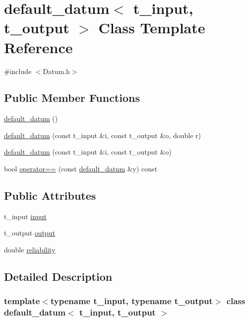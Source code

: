 \hypertarget{classdefault__datum}{}\section{default\+\_\+datum$<$ t\+\_\+input, t\+\_\+output $>$ Class Template Reference}
\label{classdefault__datum}


{\ttfamily \#include $<$Datum.\+h$>$}

\subsection*{Public Member Functions}
\begin{DoxyCompactItemize}
\item 
\hyperlink{classdefault__datum_a7153b5621e08e438753c4a90271c2eee}{default\+\_\+datum} ()
\item 
\hyperlink{classdefault__datum_aaaa9c76cb8d02eab61cc6f0c3570a64d}{default\+\_\+datum} (const t\+\_\+input \&i, const t\+\_\+output \&o, double r)
\item 
\hyperlink{classdefault__datum_aab82d7d96c8fdcecc36b554b83a5e5e2}{default\+\_\+datum} (const t\+\_\+input \&i, const t\+\_\+output \&o)
\item 
bool \hyperlink{classdefault__datum_a1da1cd62c4b98771b010d5b625c2f744}{operator==} (const \hyperlink{classdefault__datum}{default\+\_\+datum} \&y) const
\end{DoxyCompactItemize}
\subsection*{Public Attributes}
\begin{DoxyCompactItemize}
\item 
t\+\_\+input \hyperlink{classdefault__datum_a19f8427ac058ad008f5b2541e17d42e7}{input}
\item 
t\+\_\+output \hyperlink{classdefault__datum_afafbe2c709ff57daca0fd60289bdd13a}{output}
\item 
double \hyperlink{classdefault__datum_ad9d6b81d35ca8107e8c810186cef9270}{reliability}
\end{DoxyCompactItemize}


\subsection{Detailed Description}
\subsubsection*{template$<$typename t\+\_\+input, typename t\+\_\+output$>$\newline
class default\+\_\+datum$<$ t\+\_\+input, t\+\_\+output $>$}

